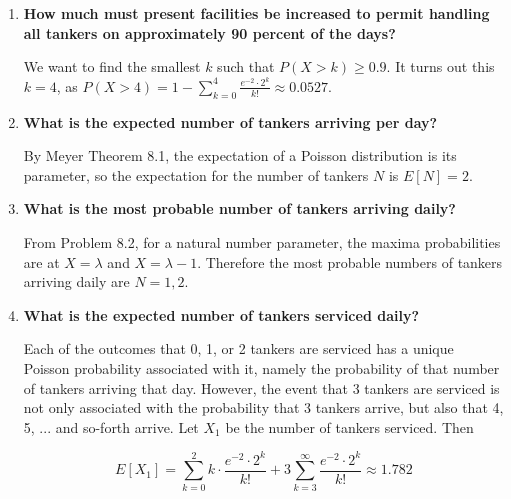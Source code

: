 \documentclass[10pt, oneside]{article}   	%
\theoremstyle{definition}
\begin{document}
\begin{enumerate}[label=8.\arabic*]
\begin{enumerate}
	\item  \begin{tcolorbox}[
	  colback=Cerulean!5!white,
	  colframe=Cerulean!75!black]
	\textbf{How much must present facilities be increased to permit handling all tankers on approximately 90 percent of the days?}
	\end{tcolorbox}
	
	We want to find the smallest $k$ such that $P(X > k) \geq 0.9$. It turns out this $\boxed{k = 4}$, as $P(X > 4) = 1 - \sum^4_{k = 0} \frac{e^{-2} \cdot 2^k }{k!} \approx 0.0527$.
	
	\item  \begin{tcolorbox}[
	  colback=Cerulean!5!white,
	  colframe=Cerulean!75!black]
	\textbf{What is the expected number of tankers arriving per day?}
	\end{tcolorbox}
	
	By Meyer Theorem 8.1, the expectation of a Poisson distribution is its parameter, so the expectation for the number of tankers $N$ is $\boxed{E[N] = 2}$.
	
	\item  \begin{tcolorbox}[
	  colback=Cerulean!5!white,
	  colframe=Cerulean!75!black]
	\textbf{What is the most probable number of tankers arriving daily?}
	\end{tcolorbox}
	
	From Problem 8.2, for a natural number parameter, the maxima probabilities are at $X = \lambda$ and $X = \lambda - 1$. Therefore the most probable numbers of tankers arriving daily are $\boxed{N = 1, 2}$.
	
	\item  \begin{tcolorbox}[
	  colback=Cerulean!5!white,
	  colframe=Cerulean!75!black]
	\textbf{What is the expected number of tankers serviced daily?}
	\end{tcolorbox}
	
	Each of the outcomes that 0, 1, or 2 tankers are serviced has a unique Poisson probability associated with it, namely the probability of that number of tankers arriving that day. However, the event that 3 tankers are serviced is not only associated with the probability that 3 tankers arrive, but also that 4, 5, ... and so-forth arrive. Let $X_1$ be the number of tankers serviced. Then
	
	\[ E[X_1] = \sum^2_{k = 0} k \cdot \frac{e^{-2} \cdot 2^k}{k!} + 3 \sum^{\infty}_{k = 3} \frac{e^{-2} \cdot 2^k}{k!} \approx \boxed{1.782} \]
	

\end{enumerate}
\end{enumerate}
\end{document}
